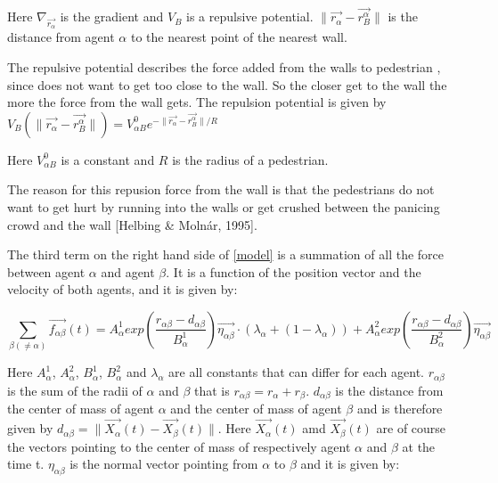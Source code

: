 Here $\nabla_{\vec{r_{\alpha}}}$ is the gradient and $V_B$ is a repulsive 
potential. $ \| \vec{r_{\alpha}} - \vec{r_{B}^{\alpha}} \|$ is the distance 
from agent $\alpha$ to the nearest point of the nearest wall.

The repulsive potential describes the force added from the walls to pedestrian \alpha, since \alpha does not
want to get too close to the wall. So the closer \alpha get to the wall the more the force from the wall gets.
The repulsion potential is given by  $V_{B} \left( \| \vec{r_{\alpha}} - \vec{r_{B}^{\alpha}} \| \right) =
V^0_{\alpha B} e^{- \| \vec{r_{\alpha}} - \vec{r_{B}^{\alpha}} \| / R }$

Here $V^0_{\alpha B}$ is a constant and $R$ is the radius of a pedestrian.

The reason for this repusion force from the wall is that the pedestrians do not want to get hurt by running into the walls
or get crushed between the panicing crowd and the wall [Helbing & Molnár, 1995].

The third term on the right hand side of \eqref{model} is a summation of all the 
force between agent $\alpha$ and agent $\beta$. It is a function of the position vector and the velocity of 
both agents, and it is given by:

\begin{equation}
    \sum_{\beta \left( \neq \alpha \right)}
        \vec{f_{\alpha \beta }}\left( t \right) =
        A_{\alpha}^{1} exp \left(
            \frac{ r_{\alpha \beta} - d_{\alpha \beta }}
                 {B_{\alpha}^1}
        \right)
    \vec{\eta_{\alpha \beta}} \cdot
    \left(
        \lambda_{\alpha} + \left(
            1 - \lambda_{\alpha}
        \right)
    \right) +
    A_{\alpha}^{2} exp\left(
        \frac{r_{\alpha \beta} - d_{\alpha \beta}}
             {B_{\alpha}^{2}}
    \right)
    \vec{\eta_{\alpha \beta}}
    \label{agentinteraction}
\end{equation}

Here $A_{\alpha}^{1}$, $A_{\alpha}^{2}$, $B_{\alpha}^{1}$, $B_{\alpha}^{2}$ 
and $\lambda_{\alpha}$ are all constants that can differ for each agent. 
$r_{\alpha \beta}$ is the sum of the radii of $\alpha$ and $\beta$ that is 
$r_{\alpha \beta} = r_{\alpha} + r_{\beta}$. $d_{\alpha \beta}$ is the 
distance from the center of mass of agent $\alpha$ and the center of mass of 
agent $\beta$ and is therefore given by $d_{\alpha \beta} = 
\|\vec{X_{\alpha}}\left( t \right) - \vec{X_{\beta}}\left( t \right) \|$. Here 
$\vec{X_{\alpha}}\left( t \right)$ amd $\vec{X_{\beta}}\left( t \right)$ are 
of course the vectors pointing to the center of mass of respectively agent 
$\alpha$ and $\beta$ at the time t. $\eta_{\alpha \beta}$ is the normal vector 
pointing from $\alpha$ to $\beta$ and it is given by:

